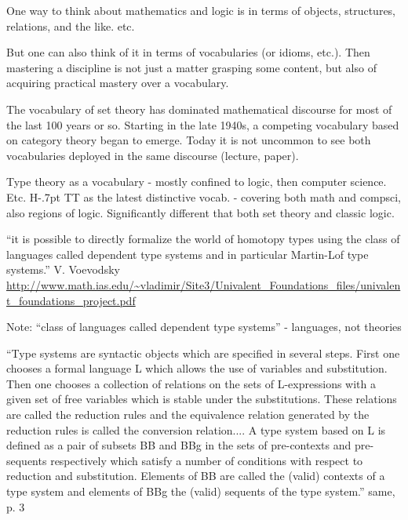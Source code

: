 \documentclass[12pt,toc]{tufte-handout}
\theoremstyle{plain}
\def\HoTT{%
  H\kern-.7pt
  {\tiny\raisebox{1pt}{o}}%
  \kern-1.5pt
  TT}
\begin{document}
One way to think about mathematics and logic is in terms of objects,
structures, relations, and the like.  etc.

But one can also think of it in terms of vocabularies (or idioms,
etc.).  Then mastering a discipline is not just a matter grasping some
content, but also of acquiring practical mastery over a vocabulary.

The vocabulary of set theory has dominated mathematical discourse for
most of the last 100 years or so.  Starting in the late 1940s, a
competing vocabulary based on category theory began to emerge.  Today
it is not uncommon to see both vocabularies deployed in the same
discourse (lecture, paper).

{\todo Type theory as a vocabulary - mostly confined to logic, then
  computer science.  Etc.  \HoTT{} as the latest distinctive vocab. -
  covering both math and compsci, also regions of logic.
  Significantly different that both set theory and classic logic.}

``it is possible to directly formalize the world of homotopy types
using the class of languages called dependent type systems and in
particular Martin-Lof type systems.'' V. Voevodsky
\url{http://www.math.ias.edu/~vladimir/Site3/Univalent\_Foundations\_files/univalent\_foundations\_project.pdf}

Note: ``class of languages called dependent type systems'' -
languages, not theories

``Type systems are syntactic objects which are specified in several
steps. First one chooses a formal language L which allows the use of
variables and substitution. Then one chooses a collection of relations
on the sets of L-expressions with a given set of free variables which
is stable under the substitutions. These relations are called the
reduction rules and the equivalence relation generated by the
reduction rules is called the conversion relation....  A type system
based on L is defined as a pair of subsets BB and BBg in the sets of
pre-contexts and pre-sequents respectively which satisfy a number of
conditions with respect to reduction and substitution. Elements of BB
are called the (valid) contexts of a type system and elements of BBg
the (valid) sequents of the type system.'' same, p. 3






\clearpage
\appendix
\begin{appendices}








\end{appendices}
\end{document}
